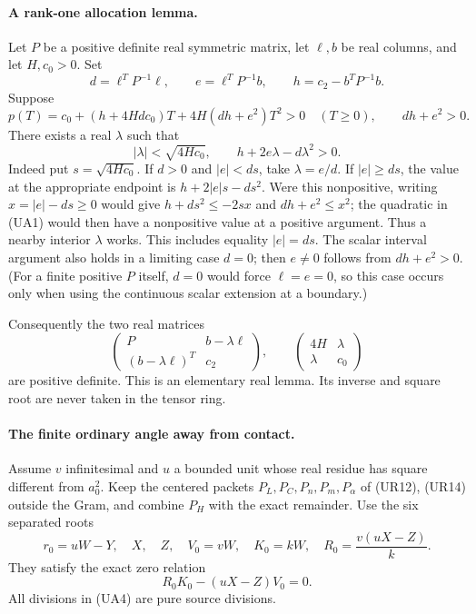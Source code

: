 \paragraph{A rank-one allocation lemma.}
Let $P$ be a positive definite real symmetric matrix, let $\ell,b$ be
real columns, and let $H,c_0>0$. Set
\[
 d=\ell^TP^{-1}\ell,\qquad e=\ell^TP^{-1}b,\qquad
 h=c_2-b^TP^{-1}b.
\]
Suppose
\[
 p(T)=c_0+(h+4Hdc_0)T+4H(dh+e^2)T^2>0\quad(T\ge0),
 \qquad dh+e^2>0.                                      \tag{UA1}
\]
There exists a real $\lambda$ such that
\[
 |\lambda|<\sqrt{4Hc_0},\qquad
 h+2e\lambda-d\lambda^2>0.                             \tag{UA2}
\]
Indeed put $s=\sqrt{4Hc_0}$. If $d>0$ and $|e|<ds$, take
$\lambda=e/d$. If $|e|\ge ds$, the value at the appropriate endpoint
is $h+2|e|s-ds^2$. Were this nonpositive, writing
$x=|e|-ds\ge0$ would give
$h+ds^2\le-2sx$ and $dh+e^2\le x^2$; the quadratic in (UA1)
would then have a nonpositive value at a positive argument. Thus a
nearby interior $\lambda$ works. This includes equality $|e|=ds$.
The scalar interval argument also holds in a limiting case $d=0$;
then $e\ne0$ follows from $dh+e^2>0$. (For a finite positive $P$
itself, $d=0$ would force $\ell=e=0$, so this case occurs only
when using the continuous scalar extension at a boundary.)

Consequently the two real matrices
\[
 \begin{pmatrix}P&b-\lambda\ell\\(b-\lambda\ell)^T&c_2\end{pmatrix},
 \qquad
 \begin{pmatrix}4H&\lambda\\\lambda&c_0\end{pmatrix}       \tag{UA3}
\]
are positive definite. This is an elementary real lemma. Its inverse
and square root are never taken in the tensor ring.

\paragraph{The finite ordinary angle away from contact.}
Assume $v$ infinitesimal and $u$ a bounded unit whose real residue has
square different from $a_0^2$. Keep the centered packets
$P_L,P_C,P_n,P_m,P_\alpha$ of (UR12), (UR14) outside the Gram, and
combine $P_H$ with the exact remainder. Use the six separated roots
\[
 r_0=uW-Y,\quad X,\quad Z,\quad V_0=vW,\quad K_0=kW,
 \quad R_0=\frac{v(uX-Z)}{k}.                           \tag{UA4}
\]
They satisfy the exact zero relation
\[
 R_0K_0-(uX-Z)V_0=0.                                  \tag{UA5}
\]
All divisions in (UA4) are pure source divisions.

